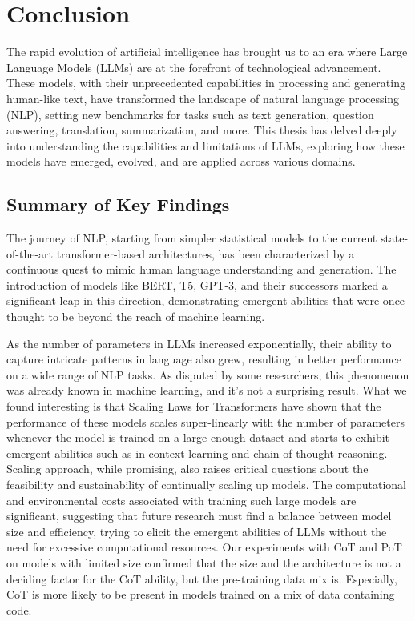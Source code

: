 
\chapter*{Conclusion}
The rapid evolution of artificial intelligence has brought us to an era where Large Language Models (LLMs) are at the forefront of technological advancement.
These models, with their unprecedented capabilities in processing and generating human-like text, have transformed the landscape of natural language processing (NLP), setting new benchmarks for tasks such as text generation, question answering, translation, summarization, and more.
This thesis has delved deeply into understanding the capabilities and limitations of LLMs, exploring how these models have emerged, evolved, and are applied across various domains.

\section*{Summary of Key Findings}
The journey of NLP, starting from simpler statistical models to the current state-of-the-art transformer-based architectures, has been characterized by a continuous quest to mimic human language understanding and generation.
The introduction of models like BERT, T5, GPT-3, and their successors marked a significant leap in this direction, demonstrating emergent abilities that were once thought to be beyond the reach of machine learning.

As the number of parameters in LLMs increased exponentially, their ability to capture intricate patterns in language also grew, resulting in better performance on a wide range of NLP tasks.
As disputed by some researchers, this phenomenon was already known in machine learning, and it's not a surprising result.
What we found interesting is that Scaling Laws for Transformers have shown that the performance of these models scales super-linearly with the number of parameters whenever the model is trained on a large enough dataset and starts to exhibit emergent abilities such as in-context learning and chain-of-thought reasoning.
Scaling approach, while promising, also raises critical questions about the feasibility and sustainability of continually scaling up models.
The computational and environmental costs associated with training such large models are significant, suggesting that future research must find a balance between model size and efficiency, trying to elicit the emergent abilities of LLMs without the need for excessive computational resources.
Our experiments with CoT and PoT on models with limited size confirmed that the size and the architecture is not a deciding factor for the CoT ability, but the pre-training data mix is.
Especially, CoT is more likely to be present in models trained on a mix of data containing code.

